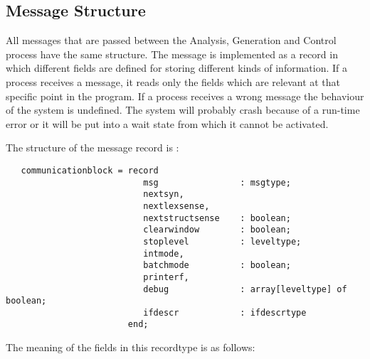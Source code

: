\subsection{Message Structure}
All messages that are passed between the Analysis, Generation and Control 
process have the same structure. The message is implemented as a record
in which different fields are defined for storing different kinds of information.
If a process receives a message, it reads only the fields which are relevant at
that specific point in the program. If a process receives a wrong message
the behaviour of the system is undefined. The system will probably crash 
because of a run-time error or it will 
be put into a wait state from which it cannot be activated. 

The structure of the message record is :
\begin{verbatim}
   communicationblock = record
                           msg                : msgtype;
                           nextsyn,
                           nextlexsense,
                           nextstructsense    : boolean;
                           clearwindow        : boolean;
                           stoplevel          : leveltype;
                           intmode,
                           batchmode          : boolean;
                           printerf,
                           debug              : array[leveltype] of boolean;
                           ifdescr            : ifdescrtype
                        end;
\end{verbatim}
The meaning of the fields in this recordtype is as follows:
